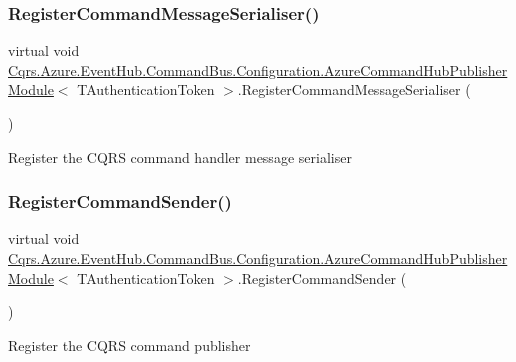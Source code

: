 \subsubsection{\texorpdfstring{Register\+Command\+Message\+Serialiser()}{RegisterCommandMessageSerialiser()}}
{\footnotesize\ttfamily virtual void \hyperlink{classCqrs_1_1Azure_1_1EventHub_1_1CommandBus_1_1Configuration_1_1AzureCommandHubPublisherModule}{Cqrs.\+Azure.\+Event\+Hub.\+Command\+Bus.\+Configuration.\+Azure\+Command\+Hub\+Publisher\+Module}$<$ T\+Authentication\+Token $>$.Register\+Command\+Message\+Serialiser (\begin{DoxyParamCaption}{ }\end{DoxyParamCaption})\hspace{0.3cm}{\ttfamily [virtual]}}



Register the C\+Q\+RS command handler message serialiser 

\mbox{\label{classCqrs_1_1Azure_1_1EventHub_1_1CommandBus_1_1Configuration_1_1AzureCommandHubPublisherModule_a2d123a815e4621013a4dbc2fe25a4925_a2d123a815e4621013a4dbc2fe25a4925}} 
\subsubsection{\texorpdfstring{Register\+Command\+Sender()}{RegisterCommandSender()}}
{\footnotesize\ttfamily virtual void \hyperlink{classCqrs_1_1Azure_1_1EventHub_1_1CommandBus_1_1Configuration_1_1AzureCommandHubPublisherModule}{Cqrs.\+Azure.\+Event\+Hub.\+Command\+Bus.\+Configuration.\+Azure\+Command\+Hub\+Publisher\+Module}$<$ T\+Authentication\+Token $>$.Register\+Command\+Sender (\begin{DoxyParamCaption}{ }\end{DoxyParamCaption})\hspace{0.3cm}{\ttfamily [virtual]}}



Register the C\+Q\+RS command publisher 

